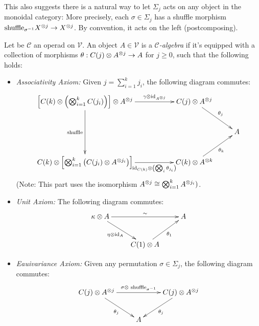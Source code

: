 \documentclass{article}
\begin{document}
\hfil

This also suggests there is a natural way to let $\Sigma_j$ acts on any object in the monoidal category: More precisely, each $\sigma\in\Sigma_j$ has a shuffle morphism $\text{shuffle}_{\sigma^{-1}}X^{\otimes j}\rightarrow X^{\otimes j}$. By convention, it acts on the left (postcomposing).

\begin{defn}
    Let be $\mathcal{C}$ an operad on $\mathcal{V}$. An object $A\in\mathcal{V}$ is a \emph{$\mathcal{C}$-algebra} if it's equipped with a collection of morphisms $\theta: C(j)\otimes A^{\otimes j}\rightarrow A$ for $j\geq 0$, such that the following holds:
    \begin{itemize}
        \item \emph{Associativity Axiom:} Given $j = \sum_{i=1}^k j_i$, the following diagram commutes:
        \[\xymatrix{
            \left[C(k)\tensor \left(\bigtensor_{i=1}^k C(j_i)\right)\right] \tensor A^{\tensor j} \ar[dd]_-{\text{shuffle}} \ar[rr]^-{\gamma\tensor \id_{A^{\tensor j}}} && C(j)\tensor A^{\tensor j} \ar[dr]^-{\theta_j}\\
            & & & A\\
            C(k)\tensor \left[\bigtensor_{i=1}^k \left(C(j_i)\tensor A^{\tensor j_i}\right)\right] \ar[rr]_-{\id_{C(k)}\tensor \left(\bigtensor_i \theta_{j_i}\right)} && C(k)\tensor A^{\tensor k} \ar[ur]_-{\theta_k}
        }\]
        (Note: This part uses the isomorphism $A^{\otimes j}\cong\bigotimes_{i=1}^k A^{\otimes j_i})$.
        \item \emph{Unit Axiom:} The following diagram commutes:
        \[\xymatrix{
            \kappa \tensor A \ar[dr]_-{\eta\tensor \id_A} \ar[rr]^-{\sim} && A\\
            & C(1)\tensor A \ar[ur]_-{\theta_1}
        }\]
        \item \emph{Eauivariance Axiom:} Given any permutation $\sigma\in\Sigma_j$, the following diagram commutes:
        \[\xymatrix{
            C(j)\tensor A^{\tensor j} \ar[dr]_-{\theta_j} \ar[rr]^-{\sigma\tensor \text{ shuffle}_{\sigma^{-1}}} && C(j)\tensor A^{\tensor j} \ar[dl]^-{\theta_j}\\
            & A
        }\]
    \end{itemize}
\end{defn}
\end{document}
